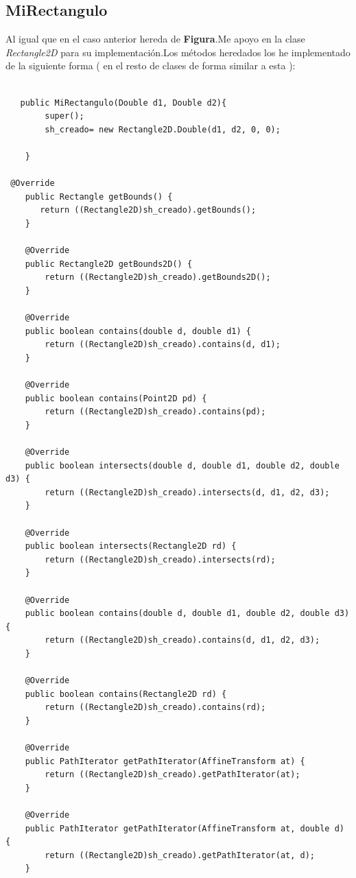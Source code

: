 \subsection{MiRectangulo}
Al igual que en el caso anterior hereda de \textbf{Figura}.Me apoyo en la clase \emph{Rectangle2D}\cite{Rectangulo} para su implementación.Los métodos heredados los he implementado de la siguiente forma ( en el resto de clases de forma similar a esta ):
\begin{lstlisting}

   public MiRectangulo(Double d1, Double d2){
        super();
        sh_creado= new Rectangle2D.Double(d1, d2, 0, 0);
        
    }
    
 @Override
    public Rectangle getBounds() {
       return ((Rectangle2D)sh_creado).getBounds();
    }

    @Override
    public Rectangle2D getBounds2D() {
        return ((Rectangle2D)sh_creado).getBounds2D();
    }

    @Override
    public boolean contains(double d, double d1) {
        return ((Rectangle2D)sh_creado).contains(d, d1); 
    }

    @Override
    public boolean contains(Point2D pd) {
        return ((Rectangle2D)sh_creado).contains(pd);
    }

    @Override
    public boolean intersects(double d, double d1, double d2, double d3) {
        return ((Rectangle2D)sh_creado).intersects(d, d1, d2, d3);
    }

    @Override
    public boolean intersects(Rectangle2D rd) {
        return ((Rectangle2D)sh_creado).intersects(rd); 
    }

    @Override
    public boolean contains(double d, double d1, double d2, double d3) {
        return ((Rectangle2D)sh_creado).contains(d, d1, d2, d3);
    }

    @Override
    public boolean contains(Rectangle2D rd) {
        return ((Rectangle2D)sh_creado).contains(rd);
    }

    @Override
    public PathIterator getPathIterator(AffineTransform at) {
        return ((Rectangle2D)sh_creado).getPathIterator(at);
    }

    @Override
    public PathIterator getPathIterator(AffineTransform at, double d) {
        return ((Rectangle2D)sh_creado).getPathIterator(at, d);
    }
         
    
\end{lstlisting}
